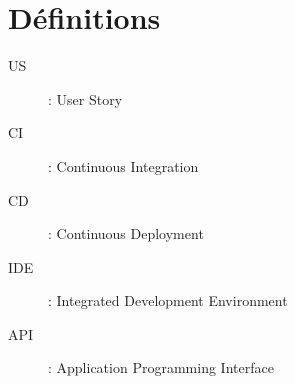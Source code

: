 \section{Définitions}

\begin{description}
  \item[US]: User Story 
  \item[CI]: Continuous Integration 
  \item[CD]: Continuous Deployment 
  \item[IDE]: Integrated Development Environment 
  \item[API]: Application Programming Interface
\end{description}
